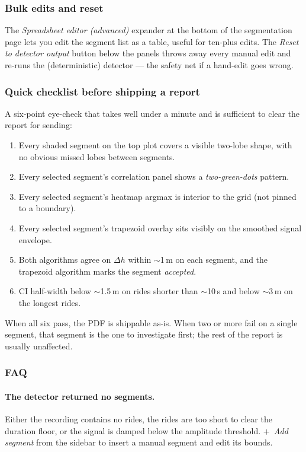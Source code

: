 \subsubsection{Bulk edits and reset}

The \emph{Spreadsheet editor (advanced)} expander at the bottom of
the segmentation page lets you edit the segment list as a table,
useful for ten-plus edits. The \emph{Reset to detector output}
button below the panels throws away every manual edit and re-runs
the (deterministic) detector --- the safety net if a hand-edit
goes wrong.

\subsubsection{Quick checklist before shipping a report}

A six-point eye-check that takes well under a minute and is
sufficient to clear the report for sending:

\begin{enumerate}
  \item Every shaded segment on the top plot covers a visible
    two-lobe shape, with no obvious missed lobes between segments.
  \item Every selected segment's correlation panel shows a
    \emph{two-green-dots} pattern.
  \item Every selected segment's heatmap argmax is interior to
    the grid (not pinned to a boundary).
  \item Every selected segment's trapezoid overlay sits visibly
    on the smoothed signal envelope.
  \item Both algorithms agree on $\Delta h$ within $\sim$1\,m on
    each segment, and the trapezoid algorithm marks the segment
    \emph{accepted}.
  \item CI half-width below $\sim$1.5\,m on rides shorter than
    $\sim$10\,s and below $\sim$3\,m on the longest rides.
\end{enumerate}

When all six pass, the PDF is shippable as-is. When two or more
fail on a single segment, that segment is the one to investigate
first; the rest of the report is usually unaffected.

\subsubsection{FAQ}

\paragraph{The detector returned no segments.} Either the recording
contains no rides, the rides are too short to clear the duration
floor, or the signal is damped below the amplitude threshold.
\emph{$+$~Add segment} from the sidebar to insert a manual segment
and edit its bounds.

